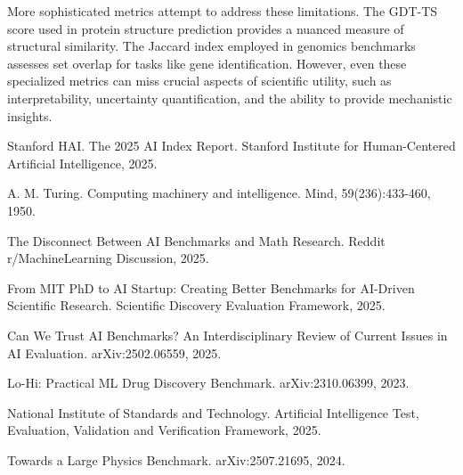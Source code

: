 \documentclass[10pt,twocolumn]{article}
\begin{document}
More sophisticated metrics attempt to address these limitations. The GDT-TS score used in protein structure prediction provides a nuanced measure of structural similarity. The Jaccard index employed in genomics benchmarks assesses set overlap for tasks like gene identification. However, even these specialized metrics can miss crucial aspects of scientific utility, such as interpretability, uncertainty quantification, and the ability to provide mechanistic insights.



\begin{thebibliography}{99}

Stanford HAI. The 2025 AI Index Report. Stanford Institute for Human-Centered Artificial Intelligence, 2025.

A. M. Turing. Computing machinery and intelligence. Mind, 59(236):433-460, 1950.

The Disconnect Between AI Benchmarks and Math Research. Reddit r/MachineLearning Discussion, 2025.

From MIT PhD to AI Startup: Creating Better Benchmarks for AI-Driven Scientific Research. Scientific Discovery Evaluation Framework, 2025.

Can We Trust AI Benchmarks? An Interdisciplinary Review of Current Issues in AI Evaluation. arXiv:2502.06559, 2025.

Lo-Hi: Practical ML Drug Discovery Benchmark. arXiv:2310.06399, 2023.

National Institute of Standards and Technology. Artificial Intelligence Test, Evaluation, Validation and Verification Framework, 2025.

Towards a Large Physics Benchmark. arXiv:2507.21695, 2024.

\end{thebibliography}
\end{document}
